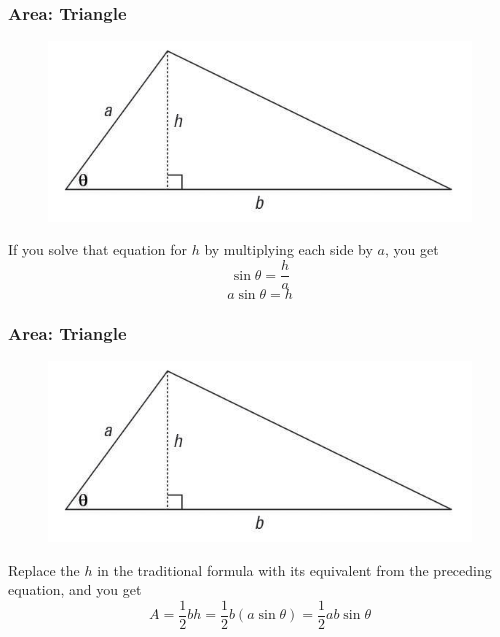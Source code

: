 \documentclass[xcolor=dvipsnames]{beamer}
\begin{document}
\begin{frame}
  \frametitle{Area: Triangle}
  \begin{figure}[h]
    \includegraphics[scale=.5]{./areatri.png}
  \end{figure}
If you solve that equation for $h$ by multiplying each side by $a$,
you get
\begin{equation}
  \label{eq:gohgaese}
  \sin\theta=\frac{h}{a}
\end{equation}
\begin{equation}
  \label{eq:sheichuc}
  a\sin\theta=h
\end{equation}
\end{frame}

\begin{frame}
  \frametitle{Area: Triangle}
  \begin{figure}[h]
    \includegraphics[scale=.5]{./areatri.png}
  \end{figure}
  Replace the $h$ in the traditional formula with its equivalent from
  the preceding equation, and you get
  \begin{equation}
    \label{eq:eakohcel}
    A=\frac{1}{2}bh=\frac{1}{2}b(a\sin\theta)=\frac{1}{2}ab\sin\theta
  \end{equation}
\end{frame}
\end{document}

